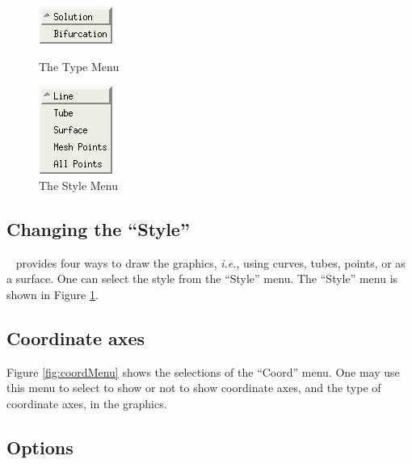 \begin{figure}[!htmb]
    \begin{minipage}[b]{0.5\textwidth}
        \begin{center}
        \includegraphics {./include/typeMenu}
        \caption{The Type Menu} \label{fig:tpyeMenu}
	\end{center}
    \end{minipage}%
    \begin{minipage}[b]{0.5\textwidth}
        \begin{center}
        \includegraphics {./include/styleMenuNew}
        \caption{The Style Menu} \label{fig:styleMenu}
	\end{center}
    \end{minipage}
\end{figure}

\subsection{Changing the ``Style''}

\PLAUT~ provides four ways to draw the graphics, \textit{i.e.}, using 
curves, tubes, points, or as a surface. One can select the style from 
the ``Style'' menu. The ``Style'' menu is shown in Figure \ref{fig:styleMenu}.

\subsection{Coordinate axes} 

Figure \ref{fig:coordMenu} shows the selections of the ``Coord'' menu.
One may use this menu to select to show or not to show 
coordinate axes, and the type of coordinate axes, in the graphics.

\subsection{Options}

